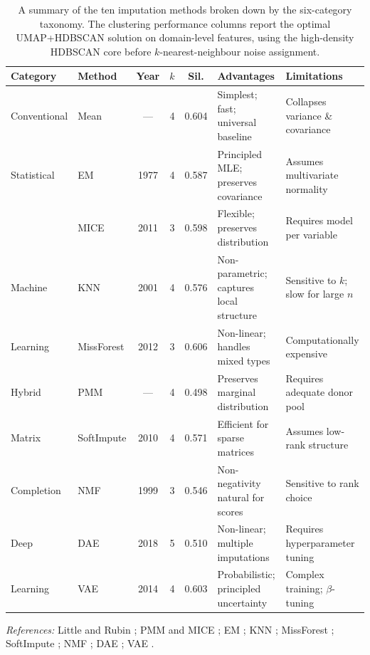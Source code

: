 \begin{table}[htbp]
\caption{A summary of the ten imputation methods broken down by the six-category taxonomy. The clustering performance columns report the optimal UMAP+HDBSCAN solution on domain-level features, using the high-density HDBSCAN core before \(k\)-nearest-neighbour noise assignment.}
\label{tab:method_summary}
\centering
\scriptsize
\renewcommand{\arraystretch}{1.4}
\begin{tabular}{@{} p{1.8cm} l c c c p{3.2cm} p{3cm} @{}}
\toprule
\textbf{Category} & \textbf{Method} & \textbf{Year} & \textbf{$k$} & \textbf{Sil.} & \textbf{Advantages} & \textbf{Limitations} \\
\midrule
Conventional & Mean       & ---  & 4 & 0.604 & Simplest; fast; universal baseline & Collapses variance \& covariance \\
Statistical  & EM         & 1977 & 4 & 0.587 & Principled MLE; preserves covariance & Assumes multivariate normality \\
             & MICE       & 2011 & 3 & 0.598 & Flexible; preserves distribution & Requires model per variable \\
\midrule
Machine      & KNN        & 2001 & 4 & 0.576 & Non-parametric; captures local structure & Sensitive to $k$; slow for large $n$ \\
Learning     & MissForest & 2012 & 3 & 0.606 & Non-linear; handles mixed types & Computationally expensive \\
\midrule
Hybrid       & PMM        & ---  & 4 & 0.498 & Preserves marginal distribution & Requires adequate donor pool \\
\midrule
Matrix       & SoftImpute & 2010 & 4 & 0.571 & Efficient for sparse matrices & Assumes low-rank structure \\
Completion   & NMF        & 1999 & 3 & 0.546 & Non-negativity natural for scores & Sensitive to rank choice \\
\midrule
Deep         & DAE        & 2018 & 5 & 0.510 & Non-linear; multiple imputations & Requires hyperparameter tuning \\
Learning     & VAE        & 2014 & 4 & 0.603 & Probabilistic; principled uncertainty & Complex training; $\beta$-tuning \\
\bottomrule
\end{tabular}

\vspace{0.5em}
\raggedright
\scriptsize
\textit{References:} Little and Rubin \parencite{little2019statistical}; PMM and MICE \parencite{vanbuuren2011mice}; EM \parencite{dempster1977maximum}; KNN \parencite{troyanskaya2001missing}; MissForest \parencite{stekhoven2012missforest}; SoftImpute \parencite{mazumder2010spectral}; NMF \parencite{lee1999learning}; DAE \parencite{gondara2018mida}; VAE \parencite{kingma2014auto, mccoy2018variational}.
\end{table}

